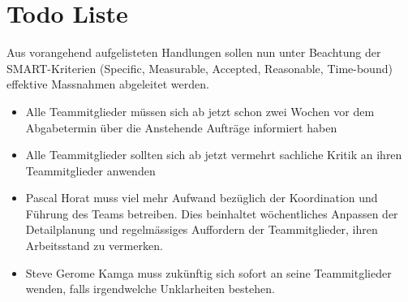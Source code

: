 
\chapter{Todo Liste}

Aus vorangehend aufgelisteten Handlungen sollen nun unter Beachtung der 
SMART-Kriterien (Specific, Measurable, Accepted, Reasonable, Time-bound) 
effektive Massnahmen abgeleitet werden. 

\begin{itemize}

\item Alle Teammitglieder müssen sich ab jetzt schon zwei Wochen vor dem Abgabetermin über die Anstehende Aufträge informiert haben
\item Alle Teammitglieder sollten sich ab jetzt vermehrt sachliche Kritik an ihren Teammitglieder anwenden  
\item Pascal Horat muss viel mehr Aufwand bezüglich der Koordination und Führung \cite{belbin1981management} des Teams betreiben. Dies beinhaltet wöchentliches Anpassen der Detailplanung und regelmässiges Auffordern der Teammitglieder, ihren Arbeitsstand zu vermerken.
\item Steve Gerome Kamga muss zukünftig sich sofort an seine Teammitglieder wenden, falls irgendwelche Unklarheiten bestehen.

\end{itemize}
